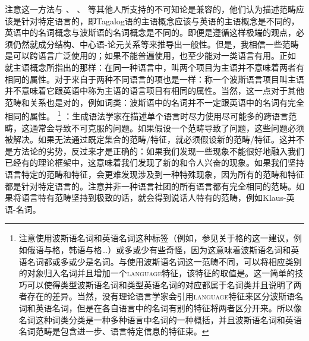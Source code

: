注意这一方法与 \citet{Haspelmath2010a}、 \citet{Dryer97a-u}、 \citet[\S~1.4.2--1.4.3]{Croft2001a}等其他人所支持的不可知论是兼容的，他们认为描述范畴应该是针对特定语言的，即Tagalog语的主语概念应该与英语的主语概念是不同的，英语中的名词概念与波斯语的名词概念是不同的。即便是遵循这样极端的观点，必须仍然就成分结构、中心语-论元关系等来推导出一般性。但是，我相信一些范畴是可以跨语言广泛使用的；如果不能普遍使用，也至少能对一类语言有用。正如 \citet[]{Newmeyer2010a}就主语概念所指出的那样：在同一种语言中，叫两个项目为主语并不意味着两者有相同的属性。对于来自于两种不同语言的项也是一样：称一个波斯语言项目叫主语并不意味着它跟英语中称为主语的语言项目有相同的属性。当然，这一点对于其他范畴和关系也是对的，例如词类：波斯语中的名词并不一定跟英语中的名词有完全相同的属性。 \footnote{%
注意使用波斯语名词和英语名词这种标签（例如，参见\citealp[\S~2]{Haspelmath2010a}关于格的这一建议，例如俄语与格，韩语与格\ldots）或多或少有些奇怪，因为这意味着波斯语名词和英语名词都或多或少是名词。与使用波斯语名词这一范畴不同，可以将相应类别的对象归入名词并且增加一个\textsc{language}特征，该特征的取值是。这一简单的技巧可以使得类型波斯语名词和类型英语名词的对应都属于名词类并且说明了两者存在的差异。当然，没有理论语言学家会引用\textsc{language}特征来区分波斯语名词和英语名词，但是在各自语言中的名词有别的特征将两者区分开来。所以像名词这种词类分类是一种多种语言中名词的一种概括，并且波斯语名词和英语名词范畴是包含进一步、语言特定信息的特征束。  
} \citet[]{Haspelmath2010b}：生成语法学家在描述单个语言时尽力使用尽可能多的跨语言范畴，这通常会导致不可克服的问题。如果假设一个范畴导致了问题，这些问题必须被解决。如果无法通过既定集合的范畴/特征，就必须假设新的范畴/特征。这并不是方法论的劣势，反过来才是正确的：如果我们发现一些现象不能很好地融入我们已经有的理论框架中，这意味着我们发现了新的和令人兴奋的现象。如果我们坚持语言特定的范畴和特征，会更难发现涉及到一种特殊现象，因为所有的范畴和特征都是针对特定语言的。注意并非一种语言社团的所有语言都有完全相同的范畴。如果将语言特有范畴坚持到极致的话，就会得到说话人特有的范畴，例如Klaus-英语-名词。

